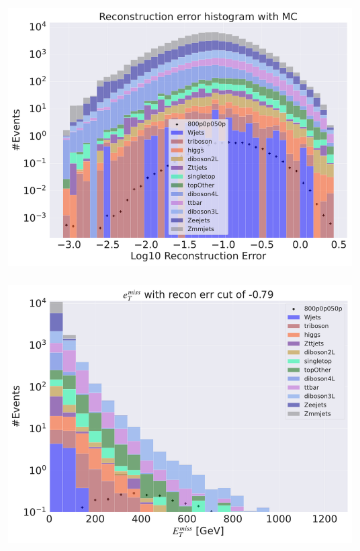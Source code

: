 \begin{figure}[H]
    \centering
    \begin{subfigure}{.49\textwidth}
        \includegraphics[width=\textwidth]{Figures/VAE_testing/big/3lep/b_data_recon_big_rm3_feats_sig_800p0p050p.pdf}
        \caption{ }
        \label{fig:VAE_3lep_big_800_2}
    \end{subfigure}
    \hfill
    \begin{subfigure}{.49\textwidth}
        \includegraphics[width=\textwidth]{Figures/VAE_testing/big/3lep/b_data_recon_big_rm3_feats_sig_800p0p050p_etmiss_recon_errcut_-0.79.pdf}
        \caption{}
        \label{fig:VAE_3lep_big_etmiss_800_2}
    \end{subfigure}

\end{figure}
